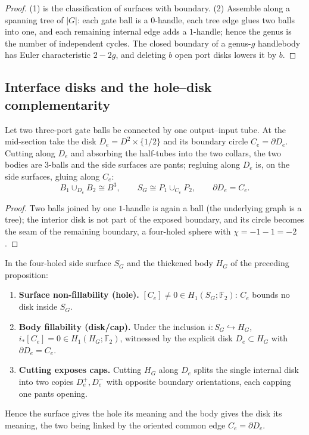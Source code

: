 \begin{proof}
(1) is the classification of surfaces with boundary.  (2) Assemble along a
spanning tree of $|G|$: each gate ball is a $0$-handle, each tree edge glues two
balls into one, and each remaining internal edge adds a $1$-handle; hence the
genus is the number of independent cycles.  The closed boundary of a genus-$g$
handlebody has Euler characteristic $2-2g$, and deleting $b$ open port disks
lowers it by $b$.
\end{proof}

\subsection{Interface disks and the hole--disk complementarity}

\begin{proposition}
\label{prop:pants-gluing-interface-disk}
Let two three-port gate balls be connected by one output--input tube.  At the
mid-section take the disk $D_e=D^2\times\{1/2\}$ and its boundary circle
$C_e=\partial D_e$.  Cutting along $D_e$ and absorbing the half-tubes into the
two collars, the two bodies are $3$-balls and the side surfaces are pants;
regluing along $D_e$ is, on the side surfaces, gluing along $C_e$:
\[
  B_1\cup_{D_e}B_2\cong B^3,
  \qquad
  S_G\cong P_1\cup_{C_e}P_2,
  \qquad
  \partial D_e=C_e .
\]
\end{proposition}

\begin{proof}
Two balls joined by one $1$-handle is again a ball (the underlying graph is a
tree); the interior disk is not part of the exposed boundary, and its circle
becomes the seam of the remaining boundary, a four-holed sphere with
$\chi=-1-1=-2$.
\end{proof}

\begin{theorem}
\label{thm:hole-disk-complementarity}
In the four-holed side surface $S_G$ and the thickened body $H_G$ of the
preceding proposition:
\begin{enumerate}
  \item \textbf{Surface non-fillability (hole).} $[C_e]\neq0\in H_1(S_G;\mathbb F_2)$:
  $C_e$ bounds no disk inside $S_G$.
  \item \textbf{Body fillability (disk/cap).} Under the inclusion
  $i:S_G\hookrightarrow H_G$, $i_*[C_e]=0\in H_1(H_G;\mathbb F_2)$, witnessed by
  the explicit disk $D_e\subset H_G$ with $\partial D_e=C_e$.
  \item \textbf{Cutting exposes caps.} Cutting $H_G$ along $D_e$ splits the single
  internal disk into two copies $D_e^+,D_e^-$ with opposite boundary
  orientations, each capping one pants opening.
\end{enumerate}
Hence the surface gives the hole its meaning and the body gives the disk its
meaning, the two being linked by the oriented common edge $C_e=\partial D_e$.
\end{theorem}

